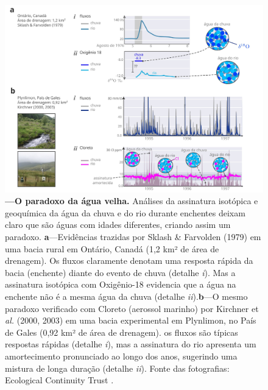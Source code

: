 \documentclass[./main.tex]{subfiles}
\begin{document}
\begin{figure}[t!] 
\centering				
\includegraphics[width=0.98\linewidth]{figs/fig_paradox2.jpg}		
\caption[O paradoxo da água velha]
{\textbf{---\;O paradoxo da água velha.}
    Análises da assinatura isotópica e geoquímica da água da chuva e do rio durante enchentes deixam claro que são águas com idades diferentes, criando assim um paradoxo. \;\textbf{a}\;---\;Evidências trazidas por Sklash \& Farvolden (1979) \cite{sklash1979} em uma bacia rural em Ontário, Canadá (1,2 km² de área de drenagem). Os fluxos claramente denotam uma resposta rápida da bacia (enchente) diante do evento de chuva (detalhe \textrm{\textit{i}}). Mas a assinatura isotópica com Oxigênio-18 evidencia que a água na enchente não é a mesma água da chuva (detalhe \textrm{\textit{ii}}).\;\textbf{b}\;---\;O mesmo paradoxo verificado com Cloreto (aerossol marinho) por Kirchner et \textit{al.} (2000, 2003) \cite{kirchner2000, Kirchner2003} em uma bacia experimental em Plynlimon, no País de Gales (0,92 km² de área de drenagem). os fluxos são típicas respostas rápidas (detalhe \textrm{\textit{i}}), mas a assinatura do rio apresenta um amortecimento pronunciado ao longo dos anos, sugerindo uma mistura de longa duração (detalhe \textrm{\textit{ii}}). Fonte das fotografias: Ecological Continuity Trust \cite{ect_plynlimon}.
}
\label{fig:hydro:paradox2} 		
\end{figure}
\end{document}
